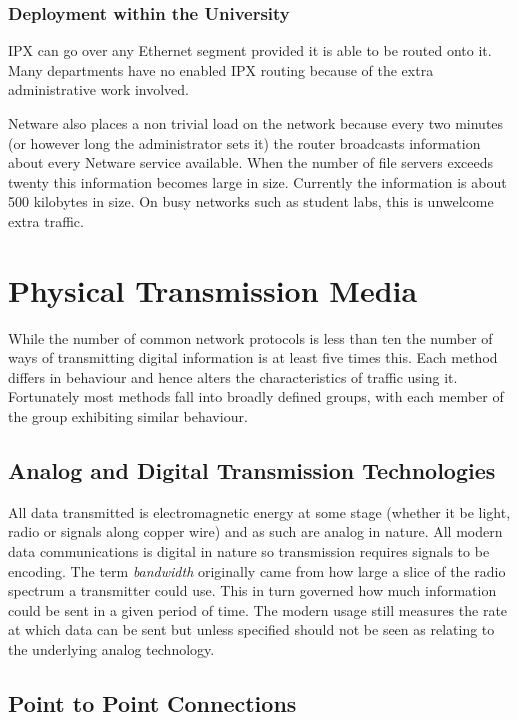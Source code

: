 \subsubsection{Deployment within the University}

IPX can go over any Ethernet segment provided it is able to be routed
onto it.  Many departments have no enabled IPX routing because of the
extra administrative work involved.

Netware also places a non trivial load on the network because every
two minutes (or however long the administrator sets it) the router
broadcasts information about every Netware service available.  When
the number of file servers exceeds twenty this information becomes
large in size.  Currently the information is about 500 kilobytes in
size.  On busy networks such as student labs, this is unwelcome extra
traffic.

\section{Physical Transmission Media}

While the number of common network protocols is less than ten the
number of ways of transmitting digital information is at least five
times this.  Each method differs in behaviour and hence alters the
characteristics of traffic using it.  Fortunately most methods fall
into broadly defined groups, with each member of the group exhibiting
similar behaviour.

\subsection{Analog and Digital Transmission Technologies}

All data transmitted is electromagnetic energy at some stage (whether
it be light, radio or signals along copper wire) and as such are
analog in nature.  All modern data communications is digital in nature
so transmission requires signals to be encoding.  The term {\em
bandwidth} originally came from how large a slice of the radio
spectrum a transmitter could use.  This in turn governed how much
information could be sent in a given period of time.  The modern usage
still measures the rate at which data can be sent but unless specified
should not be seen as relating to the underlying analog technology.

\subsection{Point to Point Connections}

